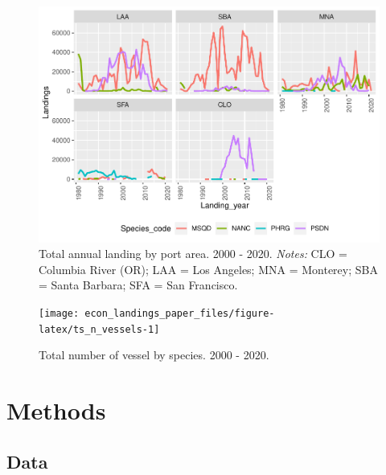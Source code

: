 \begin{Schunk}
\begin{figure}
\includegraphics{econ_landings_paper_files/figure-latex/ts_by_port-1} \caption{Total annual landing by port area. 2000 - 2020. \textit{Notes:} CLO = Columbia River (OR); LAA = Los Angeles; MNA = Monterey; SBA = Santa Barbara; SFA = San Francisco.\label{fig:ts_landings_by_ports}}\label{fig:ts_by_port}
\end{figure}
\end{Schunk}

\begin{Schunk}
\begin{figure}
\texttt{[image: econ\_landings\_paper\_files/figure-latex/ts\_n\_vessels-1]} \caption{Total number of vessel by species. 2000 - 2020.\label{fig:ts_n_vessels}}\label{fig:ts_n_vessels}
\end{figure}
\end{Schunk}

\hypertarget{methods}{%
\section{Methods}\label{methods}}

\hypertarget{data}{%
\subsection{Data}\label{data}}

